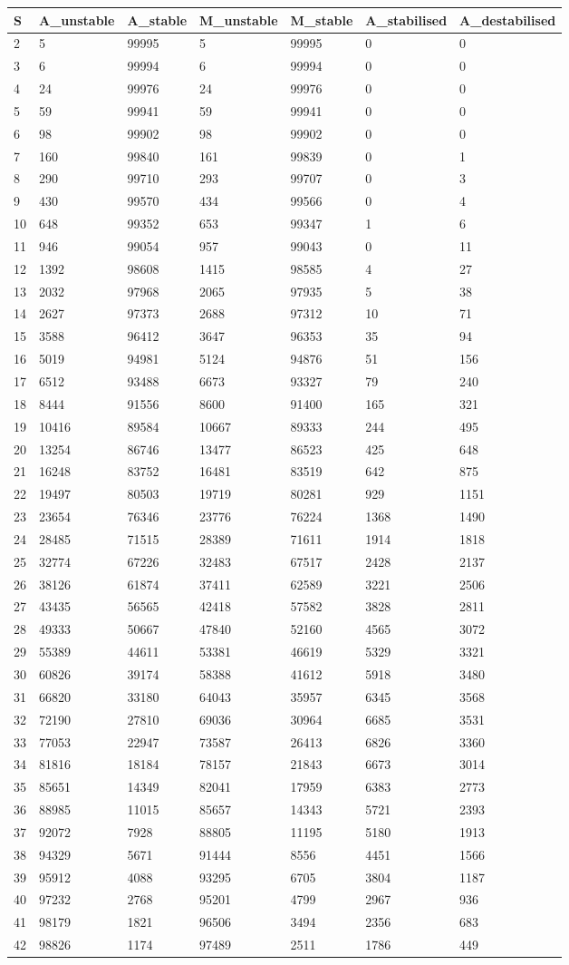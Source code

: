 \documentclass[]{article}
\begin{document}
\begin{longtable}[]{@{}lllllll@{}}
\toprule
S & A\_unstable & A\_stable & M\_unstable & M\_stable & A\_stabilised &
A\_destabilised\tabularnewline
\midrule
\endhead
2 & 5 & 99995 & 5 & 99995 & 0 & 0\tabularnewline
3 & 6 & 99994 & 6 & 99994 & 0 & 0\tabularnewline
4 & 24 & 99976 & 24 & 99976 & 0 & 0\tabularnewline
5 & 59 & 99941 & 59 & 99941 & 0 & 0\tabularnewline
6 & 98 & 99902 & 98 & 99902 & 0 & 0\tabularnewline
7 & 160 & 99840 & 161 & 99839 & 0 & 1\tabularnewline
8 & 290 & 99710 & 293 & 99707 & 0 & 3\tabularnewline
9 & 430 & 99570 & 434 & 99566 & 0 & 4\tabularnewline
10 & 648 & 99352 & 653 & 99347 & 1 & 6\tabularnewline
11 & 946 & 99054 & 957 & 99043 & 0 & 11\tabularnewline
12 & 1392 & 98608 & 1415 & 98585 & 4 & 27\tabularnewline
13 & 2032 & 97968 & 2065 & 97935 & 5 & 38\tabularnewline
14 & 2627 & 97373 & 2688 & 97312 & 10 & 71\tabularnewline
15 & 3588 & 96412 & 3647 & 96353 & 35 & 94\tabularnewline
16 & 5019 & 94981 & 5124 & 94876 & 51 & 156\tabularnewline
17 & 6512 & 93488 & 6673 & 93327 & 79 & 240\tabularnewline
18 & 8444 & 91556 & 8600 & 91400 & 165 & 321\tabularnewline
19 & 10416 & 89584 & 10667 & 89333 & 244 & 495\tabularnewline
20 & 13254 & 86746 & 13477 & 86523 & 425 & 648\tabularnewline
21 & 16248 & 83752 & 16481 & 83519 & 642 & 875\tabularnewline
22 & 19497 & 80503 & 19719 & 80281 & 929 & 1151\tabularnewline
23 & 23654 & 76346 & 23776 & 76224 & 1368 & 1490\tabularnewline
24 & 28485 & 71515 & 28389 & 71611 & 1914 & 1818\tabularnewline
25 & 32774 & 67226 & 32483 & 67517 & 2428 & 2137\tabularnewline
26 & 38126 & 61874 & 37411 & 62589 & 3221 & 2506\tabularnewline
27 & 43435 & 56565 & 42418 & 57582 & 3828 & 2811\tabularnewline
28 & 49333 & 50667 & 47840 & 52160 & 4565 & 3072\tabularnewline
29 & 55389 & 44611 & 53381 & 46619 & 5329 & 3321\tabularnewline
30 & 60826 & 39174 & 58388 & 41612 & 5918 & 3480\tabularnewline
31 & 66820 & 33180 & 64043 & 35957 & 6345 & 3568\tabularnewline
32 & 72190 & 27810 & 69036 & 30964 & 6685 & 3531\tabularnewline
33 & 77053 & 22947 & 73587 & 26413 & 6826 & 3360\tabularnewline
34 & 81816 & 18184 & 78157 & 21843 & 6673 & 3014\tabularnewline
35 & 85651 & 14349 & 82041 & 17959 & 6383 & 2773\tabularnewline
36 & 88985 & 11015 & 85657 & 14343 & 5721 & 2393\tabularnewline
37 & 92072 & 7928 & 88805 & 11195 & 5180 & 1913\tabularnewline
38 & 94329 & 5671 & 91444 & 8556 & 4451 & 1566\tabularnewline
39 & 95912 & 4088 & 93295 & 6705 & 3804 & 1187\tabularnewline
40 & 97232 & 2768 & 95201 & 4799 & 2967 & 936\tabularnewline
41 & 98179 & 1821 & 96506 & 3494 & 2356 & 683\tabularnewline
42 & 98826 & 1174 & 97489 & 2511 & 1786 & 449\tabularnewline

\end{longtable}
\end{document}
